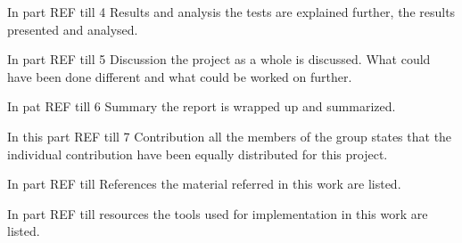 In part {REF till 4 Results and analysis} the tests are explained further, the results presented and analysed.

In part {REF till 5 Discussion} the project as a whole is discussed. What could have been done different and what could be worked on further.

In pat {REF till 6 Summary} the report is wrapped up and summarized.

In this part {REF till 7 Contribution} all the members of the group states that the individual contribution have been equally distributed for this project.

In part {REF till References} the material referred in this work are listed.

In part {REF till resources} the tools used for implementation in this work are listed. 
